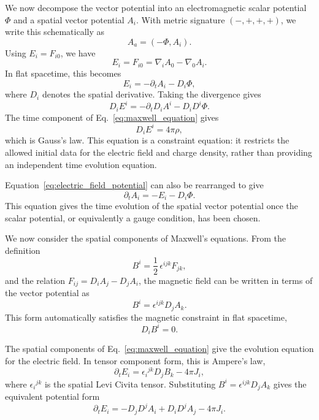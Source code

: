 We now decompose the vector potential into an electromagnetic scalar potential $\Phi$ and a spatial vector potential $A_i$. With metric signature $(-,+,+,+)$, we write this schematically as
\begin{equation}
A_a = (-\Phi,A_i).
\end{equation}
Using $E_i=F_{i0}$, we have
\begin{equation}
E_i
=
F_{i0}
=
\nabla_i A_0 - \nabla_0 A_i .
\end{equation}
In flat spacetime, this becomes
\begin{equation}
E_i
=
-\partial_t A_i - D_i\Phi ,
\label{eq:electric_field_potential}
\end{equation}
where $D_i$ denotes the spatial derivative. Taking the divergence gives
\begin{equation}
D_i E^i = -\partial_t D_i A^i - D_iD^i\Phi .
\end{equation}
The time component of Eq.~\eqref{eq:maxwell_equation} gives
\begin{equation}
D_i E^i = 4\pi \rho ,
\label{eq:gauss_law}
\end{equation}
which is Gauss's law. This equation is a constraint equation: it restricts the allowed initial data for the electric field and charge density, rather than providing an independent time evolution equation.

Equation~\eqref{eq:electric_field_potential} can also be rearranged to give
\begin{equation}
\partial_t A_i = -E_i - D_i\Phi .
\label{eq:vector_potential_evolution}
\end{equation}
This equation gives the time evolution of the spatial vector potential once the scalar potential, or equivalently a gauge condition, has been chosen.

We now consider the spatial components of Maxwell's equations. From the definition
\begin{equation}
B^i = \frac{1}{2} \, \epsilon^{ijk}F_{jk},
\end{equation}
and the relation $F_{ij}=D_iA_j-D_jA_i$, the magnetic field can be written in terms of the vector potential as
\begin{equation}
B^i = \epsilon^{ijk}D_j A_k .
\end{equation}
This form automatically satisfies the magnetic constraint in flat spacetime,
\begin{equation}
D_i B^i = 0 .
\end{equation}

The spatial components of Eq.~\eqref{eq:maxwell_equation} give the evolution equation for the electric field. In tensor component form, this is Ampere's law,
\begin{equation}
\partial_t E_i
=
\epsilon_i{}^{jk}D_j B_k
-4\pi J_i ,
\label{eq:ampere_tensor}
\end{equation}
where $\epsilon_i{}^{jk}$ is the spatial Levi Civita tensor. Substituting $B^i=\epsilon^{ijk}D_jA_k$ gives the equivalent potential form
\begin{equation}
\partial_t E_i
=
-D_jD^j A_i
+ D_iD^j A_j
- 4\pi J_i .
\label{eq:electric_field_evolution_potential}
\end{equation}


